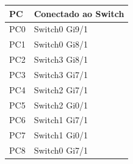 \begin{tabular}{ll}
\toprule
PC & Conectado ao Switch\\
\midrule
PC0 & Switch0 Gi9/1\\
PC1 & Switch0 Gi8/1\\
PC2 & Switch3 Gi8/1\\
PC3 & Switch3 Gi7/1\\
PC4 & Switch2 Gi7/1\\
PC5 & Switch2 Gi0/1\\
PC6 & Switch1 Gi7/1\\
PC7 & Switch1 Gi0/1\\
PC8 & Switch0 Gi7/1\\
\bottomrule
\end{tabular}

